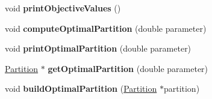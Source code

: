 \begin{DoxyCompactItemize}
\item 
\hypertarget{classHNode_a2b772372f36d2326c1d20d207f256f0a}{void {\bfseries print\-Objective\-Values} ()}\label{classHNode_a2b772372f36d2326c1d20d207f256f0a}

\item 
\hypertarget{classHNode_a074ae5b775ec9045d421492340a19275}{void {\bfseries compute\-Optimal\-Partition} (double parameter)}\label{classHNode_a074ae5b775ec9045d421492340a19275}

\item 
\hypertarget{classHNode_a4e1c467904bc2d18bcead37dac9a19dd}{void {\bfseries print\-Optimal\-Partition} (double parameter)}\label{classHNode_a4e1c467904bc2d18bcead37dac9a19dd}

\item 
\hypertarget{classHNode_aba01cb91eaeba4e7da47069d519275f7}{\hyperlink{classPartition}{Partition} $\ast$ {\bfseries get\-Optimal\-Partition} (double parameter)}\label{classHNode_aba01cb91eaeba4e7da47069d519275f7}

\item 
\hypertarget{classHNode_ad6bbcff7cf7d713bc1d554561d288f47}{void {\bfseries build\-Optimal\-Partition} (\hyperlink{classPartition}{Partition} $\ast$partition)}\label{classHNode_ad6bbcff7cf7d713bc1d554561d288f47}

\end{DoxyCompactItemize}
